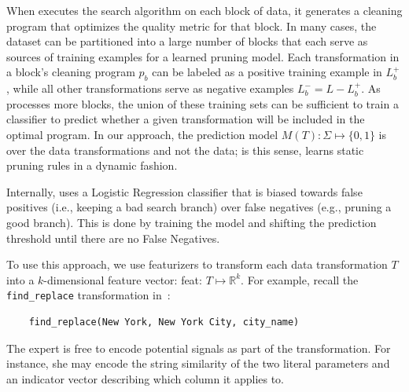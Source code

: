 
When \sys executes the search algorithm on each block of data, it generates a cleaning program that optimizes the quality metric for that block.  In many cases, the dataset can be partitioned into a large number of blocks that each serve as sources of training examples for a learned pruning model.  Each transformation in a block's  cleaning program $p_b$ can be labeled as a positive training example in $L_b^+$, while all other transformations serve as negative examples $L_b^- = L - L_b^+$.
As \sys processes more blocks, the union of these training sets can be sufficient to train a classifier to predict whether a given transformation will be included in the optimal program.  In our approach, the prediction model $M(T): \Sigma \mapsto \{0,1\}$ is over the data transformations and not the data; is this sense, \sys learns static pruning rules in a dynamic fashion.    


Internally, \sys uses a Logistic Regression classifier that is biased towards false positives (i.e., keeping a bad search branch) over false negatives (e.g., pruning a good branch). This is done by training the model and shifting the prediction threshold until there are no False Negatives. 


To use this approach, we use featurizers to transform each data transformation $T$ into a $k$-dimensional feature vector: \textsf{feat}: $T\mapsto\mathbb{R}^k$.
For example, recall the \texttt{find\_replace} transformation in~:
\begin{lstlisting}
    find_replace(New York, New York City, city_name)
\end{lstlisting}
The expert is free to encode potential signals as part of the transformation.  For instance, she may encode the string similarity of the two literal parameters and an indicator vector describing which column it applies to.  

